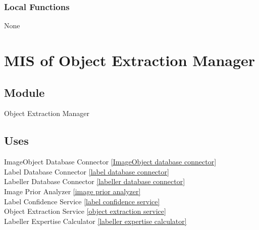 \documentclass[12pt, titlepage]{article}
\begin{document}
  
  
  \subsubsection{Local Functions}

  None
  

\newpage



\section{MIS of Object Extraction Manager }\label{object extraction manager}
  
  
  
  \subsection{Module}
  
  Object Extraction Manager
  
  \subsection{Uses}
  
  ImageObject Database Connector \ref{ImageObject database connector}\\
  Label Database Connector \ref{label database connector}\\
  Labeller Database Connector \ref{labeller database connector}\\
  Image Prior Analyzer \ref{image prior analyzer}\\
  Label Confidence Service \ref{label confidence service}\\
  Object Extraction Service \ref{object extraction service}\\
  Labeller Expertise Calculator \ref{labeller expertise calculator}\\
\end{document}
